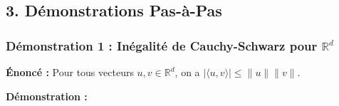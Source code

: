 \documentclass[11pt,a4paper]{report}
\begin{document}
\hypertarget{duxe9monstrations-pas-uxe0-pas}{%
\subsection{3. Démonstrations
Pas-à-Pas}\label{duxe9monstrations-pas-uxe0-pas}}

\hypertarget{duxe9monstration-1-inuxe9galituxe9-de-cauchy-schwarz-pour-mathbbrd}{%
\subsubsection{\texorpdfstring{Démonstration 1 : Inégalité de
Cauchy-Schwarz pour
\(\mathbb{R}^d\)}{Démonstration 1 : Inégalité de Cauchy-Schwarz pour \textbackslash mathbb\{R\}\^{}d}}\label{duxe9monstration-1-inuxe9galituxe9-de-cauchy-schwarz-pour-mathbbrd}}

\textbf{Énoncé :} Pour tous vecteurs \(u, v \in \mathbb{R}^d\), on a
\(| \langle u, v \rangle | \le \|u\| \|v\|\).

\textbf{Démonstration :}
\end{document}
